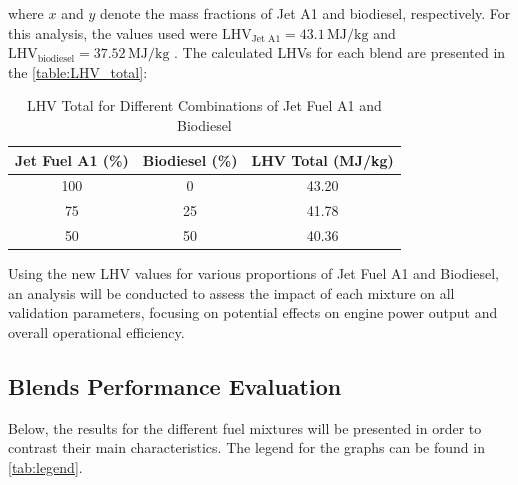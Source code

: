 \documentclass{Format}
\begin{document}
where \( x \) and \( y \) denote the mass fractions of Jet A1 and biodiesel, respectively. For this analysis, the values used were \(\text{LHV}_{\text{Jet A1}} = 43.1 \, \text{MJ/kg}\) \cite{A1specs2018} and \(\text{LHV}_{\text{biodiesel}} = 37.52 \, \text{MJ/kg}\) \cite{Mehta2009LHV}. The calculated LHVs for each blend are presented in the \autoref{table:LHV_total}:


\begin{table}[h!]
\centering
\renewcommand{\arraystretch}{1.2} %
\begin{tabular}{@{}ccc@{}}
\toprule
\textbf{Jet Fuel A1 (\%)} & \textbf{Biodiesel (\%)} & \textbf{LHV Total (MJ/kg)} \\ \midrule
100                       & 0                       & 43.20   \\
75                        & 25                      & 41.78   \\
50                        & 50                      & 40.36   \\ \bottomrule
\end{tabular}
\vspace{10pt}
\caption{LHV Total for Different Combinations of Jet Fuel A1 and Biodiesel}
\label{table:LHV_total}
\end{table}

Using the new LHV values for various proportions of Jet Fuel A1 and Biodiesel, an analysis will be conducted to assess the impact of each mixture on all validation parameters, focusing on potential effects on engine power output and overall operational efficiency.


\subsection{Blends Performance Evaluation}

Below, the results for the different fuel mixtures will be presented in order to contrast their main characteristics. The legend for the graphs can be found in \autoref{tab:legend}.
\end{document}
